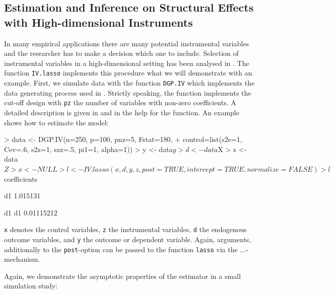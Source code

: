 \documentclass{amsart}
\begin{document}
\subsection{Estimation and Inference on Structural Effects with High-dimensional Instruments}
In many empirical applications there are many potential instrumental variables and the researcher has to make a decision which one to include. Selection of instrumental variables in a high-dimensional setting has been analysed in \cite{BCCH12}. The function \texttt{IV.lasso} implements this procedure what we will demonstrate with an example.
First, we simulate data with the function \texttt{DGP.IV} which implements the data generating process used in \cite{BCCH12}. Strictly speaking, the function implements the cut-off design with \texttt{pz} the number of variables with non-zero coefficients. A detailed description is given in \cite{BCCH12} and in the help for the function. An example shows how to estimate the model:

\begin{Schunk}
\begin{Sinput}
> data <- DGP.IV(n=250, p=100, pnz=5, Fstat=180, 
+                control=list(s2e=1, Cev=.6, s2z=1, szz=.5, pi1=1, alpha=1))
>   y <- data$y
>   d <- data$X
>   z <- data$Z
>   x <- NULL
>   l <- IV.lasso(x,d,y,z, post=TRUE, intercept=TRUE, normalize=FALSE)
>   l$coefficients
\end{Sinput}
\begin{Soutput}
       [,1]
d1 1.015131
\end{Soutput}
\begin{Soutput}
           d1
d1 0.01115212
\end{Soutput}
\end{Schunk}
\texttt{x} denotes the control variables, \texttt{z} the instrumental variables, \texttt{d} the endogenous outcome variables, and \texttt{y} the outcome or dependent variable. Again, arguments, additionally to the \texttt{post}-option can be passed to the function \texttt{lasso} via the $\ldots$-mechanism.

Again, we demonstrate the asymptotic properties of the estimator in a small simulation study:

\begin{Schunk}
\end{Schunk}
\end{document}
